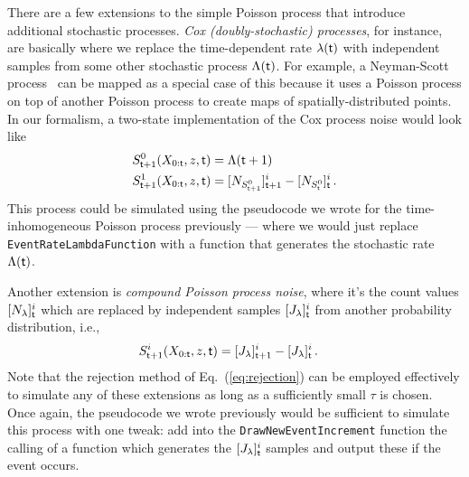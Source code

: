 There are a few extensions to the simple Poisson process that introduce additional stochastic processes. \emph{Cox (doubly-stochastic) processes}, for instance, are basically where we replace the time-dependent rate $\lambda ({\sf t})$ with independent samples from some other stochastic process $\Lambda ({\sf t})$. For example, a Neyman-Scott process~\cite{neyman1958statistical} can be mapped as a special case of this because it uses a Poisson process on top of another Poisson process to create maps of spatially-distributed points. In our formalism, a two-state implementation of the Cox process noise would look like
\begin{align}
S^{0}_{{\sf t}+1}(X_{0:{\sf t}},z,{\sf t}) &= \Lambda ({\sf t}+1) \\
S^{1}_{{\sf t}+1}(X_{0:{\sf t}},z,{\sf t}) &= [N_{S^{0}_{{\sf t}+1}}]^i_{{\sf t}+1}-[N_{S^{0}_{{\sf t}}}]^i_{\sf t}\,.
\end{align}
This process could be simulated using the pseudocode we wrote for the time-inhomogeneous Poisson process previously --- where we would just replace \texttt{EventRateLambdaFunction} with a function that generates the stochastic rate $\Lambda ({\sf t})$.

Another extension is \emph{compound Poisson process noise}, where it's the count values $[N_{\lambda}]^i_{\sf t}$ which are replaced by independent samples $[J_{\lambda}]^i_{\sf t}$ from another probability distribution, i.e.,
\begin{align}
S^{i}_{{\sf t}+1}(X_{0:{\sf t}},z,{\sf t}) &= [J_{\lambda}]^i_{{\sf t}+1}-[J_{\lambda}]^i_{\sf t}\,.
\end{align}
Note that the rejection method of Eq.~(\ref{eq:rejection}) can be employed effectively to simulate any of these extensions as long as a sufficiently small $\tau$ is chosen. Once again, the pseudocode we wrote previously would be sufficient to simulate this process with one tweak: add into the \texttt{DrawNewEventIncrement} function the calling of a function which generates the $[J_{\lambda}]^i_{\sf t}$ samples and output these if the event occurs.

